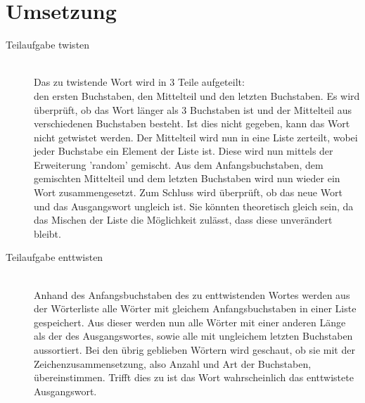 \documentclass[a4paper,10pt]{scrartcl}
\begin{document}
\section{Umsetzung}
\begin{description}
\item[Teilaufgabe twisten]\hfill\\
Das zu twistende Wort wird in 3 Teile aufgeteilt: \\
den ersten Buchstaben, den Mittelteil und den letzten Buchstaben. Es wird überprüft, ob das Wort länger als 3 Buchstaben ist und der Mittelteil aus verschiedenen Buchstaben besteht. Ist dies nicht gegeben, kann das Wort nicht getwistet werden. Der Mittelteil wird nun in eine Liste zerteilt, wobei jeder Buchstabe ein Element der Liste ist. Diese wird nun mittels der Erweiterung 'random' gemischt. Aus dem Anfangsbuchstaben, dem gemischten Mittelteil und dem letzten Buchstaben wird nun wieder ein Wort zusammengesetzt. Zum Schluss wird überprüft, ob das neue Wort und das Ausgangswort ungleich ist. Sie könnten theoretisch gleich sein, da das Mischen der Liste die Möglichkeit zulässt, dass diese unverändert bleibt. 
\item[Teilaufgabe enttwisten]\hfill\\
Anhand des Anfangsbuchstaben des zu enttwistenden Wortes werden aus der Wörterliste alle Wörter mit gleichem Anfangsbuchstaben in einer Liste gespeichert. Aus dieser werden nun alle Wörter mit einer anderen Länge als der des Ausgangswortes, sowie alle mit ungleichem letzten Buchstaben aussortiert. Bei den übrig geblieben Wörtern wird geschaut, ob sie mit der Zeichenzusammensetzung, also Anzahl und Art der Buchstaben, übereinstimmen. Trifft dies zu ist das Wort wahrscheinlich das enttwistete Ausgangswort.
\end{description}
\end{document}
